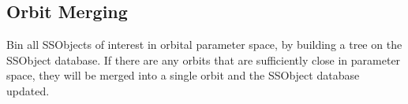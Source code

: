 \subsection{Orbit Merging}
\label{sec:acOrbitMerging}
Bin all SSObjects of interest in orbital parameter space, by building a tree on the SSObject database.  If there are any orbits that are sufficiently close in parameter space, they will be merged into a single orbit and the SSObject database updated.
